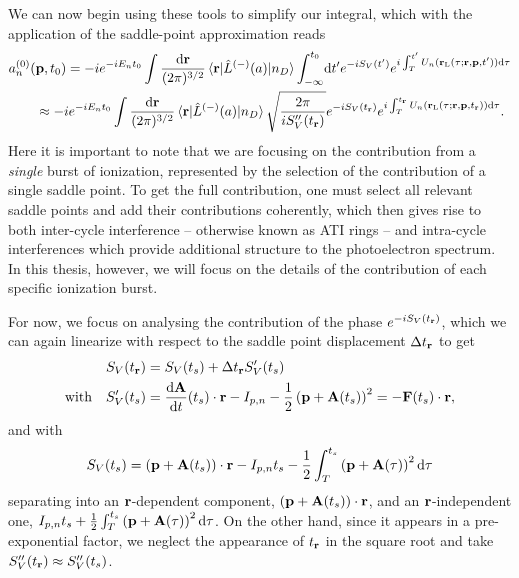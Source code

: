 We can now begin using these tools to simplify our integral, which with the application of the saddle-point approximation reads
\begin{align}
& a_n^{(0)}(\vb{p},\tn)
 =
-i e^{-iE_n\tn} 
\int\frac{\d\vbr}{(2\pi)^{3/2}}
\matrixel{\vbr}{\hat{L}^{(-)}(a)}{n_D}
\int_{-\infty}^{\tn}\!\d t'
e^{-iS_V(t')}
e^{i\int_T^{t'} U_n(\rl(\tau;\vb{r},\vbp,t'))\d\tau}
\nonumber \\ & \qquad \approx 
-i e^{-iE_n\tn} 
\int\frac{\d\vbr}{(2\pi)^{3/2}}
\matrixel{\vbr}{\hat{L}^{(-)}(a)}{n_D}
\sqrt{\frac{2\pi}{iS_V''(\tvr)}}
e^{-iS_V(\tvr)}
e^{i\int_T^{\tvr} U_n(\rl(\tau;\vb{r},\vbp,\tvr))\d\tau}
.
\label{e2-yield-after-saddle-point-approximation}
\end{align}
Here it is important to note that we are focusing on the contribution from a \textit{single} burst of ionization, represented by the selection of the contribution of a single saddle point. To get the full contribution, one must select all relevant saddle points and add their contributions coherently, which then gives rise to both inter-cycle interference -- otherwise known as ATI rings -- and intra-cycle interferences which provide additional structure to the photoelectron spectrum. In this thesis, however, we will focus on the details of the contribution of each specific ionization burst.


For now, we focus on analysing the contribution of the phase $e^{-iS_V({t_{\vb{r}}})}$, which we can again linearize with respect to the saddle point displacement $\Delta{t_{\ensuremath{\vb{r}}}}$ to get
\begin{align}
S_V({t_{\vb{r}}}) & =S_V({t_s}) + \Delta{t_{\ensuremath{\vb{r}}}} S_V'({t_s})
\\ \text{with}\quad
S_V'({t_s}) & =
\frac{\mathrm{d}\vb{A}}{\mathrm{d} t}({t_s})\cdot\vb{r}
-I_{p,n}
-\frac{1}{2} \left(\vb{p}+\vb{A}({t_s})\right)^2
=
-\vb{F}({t_s})\cdot\vb{r},
\end{align}
and with 
\begin{equation}
S_V({t_s})
=
\left(\vb{p}+\vb{A}({t_s})\right)\cdot\vb{r}
-I_{p,n} {t_s}
-\frac{1}{2} \int_T^{{t_s}}\left(\vb{p}+\vb{A}(\tau)\right)^2\mathrm{d}\tau
\end{equation}
separating into an $\vb{r}$-dependent component, $\left(\vb{p}+\vb{A}({t_s})\right) \cdot \vb{r}$, and an $\vb{r}$-independent one, $I_{p,n} {t_s} + \frac{1}{2} \int_T^{{t_s}} \left(\vb{p}+\vb{A}(\tau) \right)^2 \mathrm{d}\tau$. On the other hand, since it appears in a pre-exponential factor, we neglect the appearance of ${t_{\vb{r}}}$ in the square root and take $S_V''({t_{\vb{r}}}) \approx S_V''({t_s})$.

